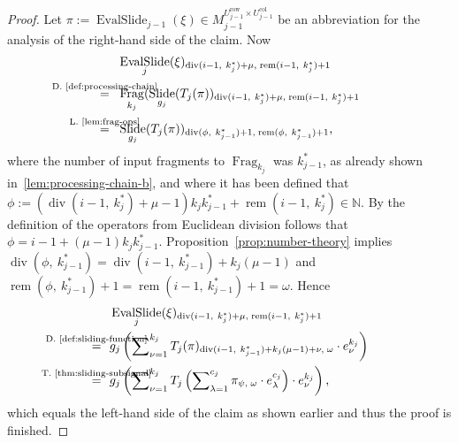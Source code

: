 \documentclass[journal]{IEEEtran}
\newcommand{\N}{\mathbb{N}}
\DeclareMathOperator{\Slide}{Slide}
\DeclareMathOperator{\Fragmentation}{Frag}
\DeclareMathOperator{\EvalSlide}{EvalSlide}
\renewcommand{\div}[2]{\operatorname{div}(#1,\ #2)}
\newcommand{\rem}[2]{\operatorname{rem}(#1,\ #2)}
\newcommand{\row}{\operatorname{row}}
\newcommand{\col}{\operatorname{col}}
\newcommand{\equsing}[1]{\overset{\mathclap{\text{#1}}}{=}}
\begin{document}
\begin{proof}
Let $\pi := \EvalSlide_{j - 1}(\xi)\in M_{j - 1}^{U_{j - 1}^{\row} \times U_{j - 1}^{\col}}$ be an abbreviation for the analysis of the right-hand side of the claim.
Now
\begin{align*}
  & \EvalSlide_j(\xi)_{\div{i - 1}{k_j^*} + \mu,\;\rem{i - 1}{k_j^*} + 1}\\
  \equsing{D.~\ref{def:processing-chain}}\ \ &\Fragmentation_{k_j}(\Slide_{g_j}(T_j(\pi))_{\div{i - 1}{k_j^*} + \mu,\;\rem{i - 1}{k_j^*} + 1}\\
  \equsing{L.~\ref{lem:frag-ops}}\ \ & \Slide_{g_j}(T_j(\pi))_{\div{\phi}{k_{j - 1}^*} + 1,\;\rem{\phi}{k_{j - 1}^*} + 1}\text{,}
\end{align*}
where the number of input fragments to $\Fragmentation_{k_j}$ was $k_{j - 1}^*$, as already shown in~\ref{lem:processing-chain-b}, and where it has been defined that
$\phi := \left(\div{i - 1}{k_j^*} + \mu - 1\right)k_jk_{j - 1}^* + \rem{i - 1}{k_j^*}\in\N$.
By the definition of the operators from Euclidean division follows that $\phi = i - 1 + (\mu - 1)k_jk_{j - 1}^*$.
Proposition~\ref{prop:number-theory} implies
$\div{\phi}{k_{j - 1}^*} = \div{i - 1}{k_{j - 1}^*} + k_j(\mu - 1)$ and $\rem{\phi}{k_{j - 1}^*} + 1 = \rem{i - 1}{k_{j - 1}^*} + 1 = \omega$.
Hence
\begin{align*}
  & \EvalSlide_j(\xi)_{\div{i - 1}{k_j^*} + \mu,\;\rem{i - 1}{k_j^*} + 1}\\
  \equsing{D.~\ref{def:sliding-function}}\ \ & g_j\left( \sum\nolimits_{\nu = 1}^{k_j} T_j(\pi)_{\div{i - 1}{k_{j - 1}^*} + k_j(\mu - 1) + \nu,\;\omega}\cdot e_\nu^{k_j} \right)\\
  \equsing{T.~\ref{thm:sliding-subsignal}}\ \ & g_j\left( \sum\nolimits_{\nu = 1}^{k_j} T_j\left( \sum\nolimits_{\lambda = 1}^{c_j} \pi_{\psi,\;\omega}\cdot e_\lambda^{c_j} \right) \cdot e_\nu^{k_j} \right)\text{,}
\end{align*}
which equals the left-hand side of the claim as shown earlier and thus the proof is finished.
\end{proof}
\end{document}
